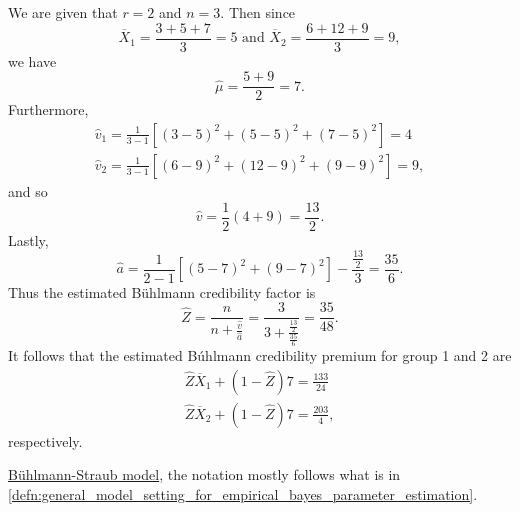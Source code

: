 \documentclass[notoc,notitlepage]{tufte-book}
\begin{document}
\begin{solution}
  We are given that $r = 2$ and $n = 3$.
  Then since
  \begin{equation*}
    \overline{X}_1 = \frac{3+5+7}{3} = 5 \text{ and }
    \overline{X}_2 = \frac{6+12+9}{3} = 9,
  \end{equation*}
  we have
  \begin{equation*}
    \hat{\mu} = \frac{5+9}{2} = 7.
  \end{equation*}
  Furthermore,
  \begin{gather*}
    \hat{v}_1 = \frac{1}{3-1}[ (3-5)^2 + (5-5)^2 + (7-5)^2 ] = 4 \\
    \hat{v}_2 = \frac{1}{3-1}[ (6-9)^2 + (12-9)^2 + (9-9)^2 ] = 9,
  \end{gather*}
  and so
  \begin{equation*}
    \hat{v} = \frac{1}{2} (4 + 9) = \frac{13}{2}.
  \end{equation*}
  Lastly,
  \begin{equation*}
    \hat{a} = \frac{1}{2-1} [(5-7)^2 + (9-7)^2] - \frac{\frac{13}{2}}{3}
          = \frac{35}{6}.
  \end{equation*}
  Thus the estimated Bühlmann credibility factor is
  \begin{equation*}
    \hat{Z} = \frac{n}{n + \frac{\hat{v}}{\hat{a}}}
    = \frac{3}{3 + \frac{\frac{13}{2}}{\frac{35}{6}}}
    = \frac{35}{48}.
  \end{equation*}
  It follows that the estimated Búhlmann credibility premium
  for group 1 and 2 are
  \begin{gather*}
    \hat{Z} \overline{X}_1 + (1 - \hat{Z}) 7 = \frac{133}{24} \\
    \hat{Z} \overline{X}_2 + (1 - \hat{Z}) 7= \frac{203}{4},
  \end{gather*}
  respectively.
\end{solution}

 \hyperref[thm:buhlmann_straub_model]{Bühlmann-Straub model},
the notation mostly follows what is in
\cref{defn:general_model_setting_for_empirical_bayes_parameter_estimation}.
\end{document}
